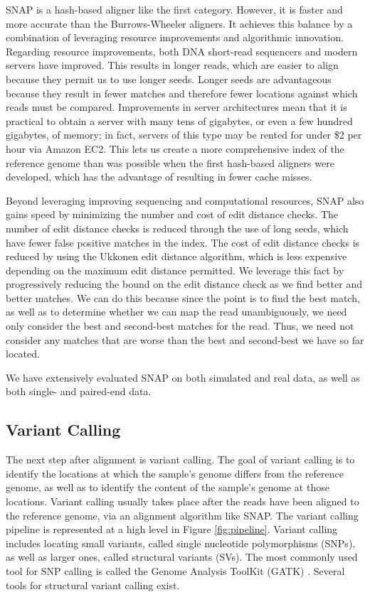 \documentclass[twocolumn,10pt]{article}
\begin{document}
SNAP is a hash-based aligner like the first category.  However, it is faster and more accurate than the Burrows-Wheeler aligners.  It achieves this balance by a combination of leveraging resource improvements and algorithmic innovation.  Regarding resource improvements, both DNA short-read sequencers and modern servers have improved.  This results in longer reads, which are easier to align because they permit us to use longer seeds.  Longer seeds are advantageous because they result in fewer matches and therefore fewer locations against which reads must be compared.  Improvements in server architectures mean that it is practical to obtain a server with many tens of gigabytes, or even a few hundred gigabytes, of memory; in fact, servers of this type may be rented for under \$2 per hour via Amazon EC2.  This lets us create a more comprehensive index of the reference genome than was possible when the first hash-based aligners were developed, which has the advantage of resulting in fewer cache misses.

Beyond leveraging improving sequencing and computational resources, SNAP also gains speed by minimizing the number and cost of edit distance checks.  The number of edit distance checks is reduced through the use of long seeds, which have fewer false positive matches in the index.  The cost of edit distance checks is reduced by using the Ukkonen edit distance algorithm, which is less expensive depending on the maximum edit distance permitted.  We leverage this fact by progressively reducing the bound on the edit distance check as we find better and better matches.  We can do this because since the point is to find the best match, as well as to determine whether we can map the read unambiguously, we need only consider the best and second-best matches for the read.  Thus, we need not consider any matches that are worse than the best and second-best we have so far located.  

We have extensively evaluated SNAP on both simulated and real data, as well as both single- and paired-end data.

\subsection{Variant Calling}

The next step after alignment is variant calling.  The goal of variant calling is to identify the locations at which the sample's genome differs from the reference genome, as well as to identify the content of the sample's genome at those locations.  Variant calling usually takes place after the reads have been aligned to the reference genome, via an alignment algorithm like SNAP.  The variant calling pipeline is represented at a high level in Figure \ref{fig:pipeline}.  Variant calling includes locating small variants, called single nucleotide polymorphisms (SNPs), as well as larger ones, called structural variants (SVs).  The most commonly used tool for SNP calling is called the Genome Analysis ToolKit (GATK) \cite{DePristo:2011}.  Several tools for structural variant calling exist.
\end{document}
